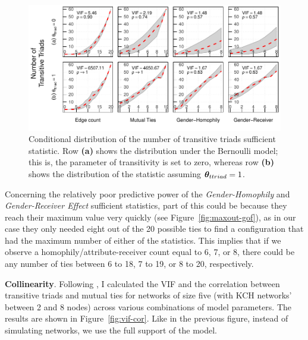 \documentclass[12pt]{article}
\begin{document}

\begin{figure}[]
    \centering
    \includegraphics[width = .85\linewidth]{figures/conditional-prob-ttriad.pdf}
    \caption[Conditional Distribution of the Transitive Triads Sufficient Statistic]{Conditional distribution of the number of transitive triads sufficient statistic. Row \textbf{(a)} shows the distribution under the Bernoulli model; this is, the parameter of transitivity is set to zero, whereas row \textbf{(b)} shows the distribution of the statistic assuming $\bm{\theta}_{ttriad} = 1$.}
    \label{fig:condprob-ttriads}
\end{figure}

Concerning the relatively poor predictive power of the \textit{Gender-Homophily} and \textit{Gender-Receiver Effect} sufficient statistics, part of this could be because they reach their maximum value very quickly (see Figure~\ref{fig:maxout-gof}), as in our case they only needed eight out of the 20 possible ties to find a configuration that had the maximum number of either of the statistics. This implies that if we observe a homophily/attribute-receiver count equal to 6, 7, or 8, there could be any number of ties between 6 to 18, 7 to 19, or 8 to 20, respectively.

\noindent \textbf{Collinearity}. Following \cite{duxburyDiagnosingMulticollinearityExponential2021}, I calculated the VIF and the correlation between transitive triads and mutual ties for networks of size five (with KCH networks' between 2 and 8 nodes) across various combinations of model parameters. The results are shown in Figure~\ref{fig:vif-cor}. Like in the previous figure, instead of simulating networks, we use the full support of the model.
\end{document}
